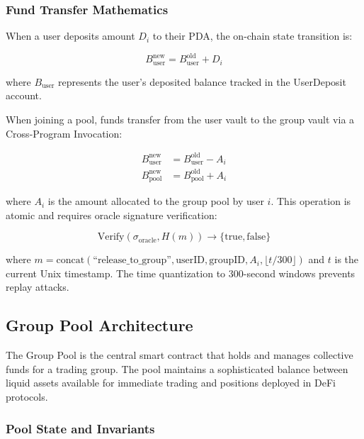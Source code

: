 \documentclass[11pt,a4paper]{article}
\begin{document}
\subsubsection{Fund Transfer Mathematics}

When a user deposits amount $D_i$ to their PDA, the on-chain state transition is:

\begin{equation}
B_{\text{user}}^{\text{new}} = B_{\text{user}}^{\text{old}} + D_i
\end{equation}

where $B_{\text{user}}$ represents the user's deposited balance tracked in the UserDeposit account.

When joining a pool, funds transfer from the user vault to the group vault via a Cross-Program Invocation:

\begin{equation}
\begin{aligned}
B_{\text{user}}^{\text{new}} &= B_{\text{user}}^{\text{old}} - A_i \\
B_{\text{pool}}^{\text{new}} &= B_{\text{pool}}^{\text{old}} + A_i
\end{aligned}
\end{equation}

where $A_i$ is the amount allocated to the group pool by user $i$. This operation is atomic and requires oracle signature verification:

\begin{equation}
\text{Verify}(\sigma_{\text{oracle}}, H(m)) \rightarrow \{\text{true}, \text{false}\}
\end{equation}

where $m = \text{concat}(\text{``release\_to\_group''}, \text{userID}, \text{groupID}, A_i, \lfloor t/300 \rfloor)$ and $t$ is the current Unix timestamp. The time quantization to 300-second windows prevents replay attacks.

\subsection{Group Pool Architecture}

The Group Pool is the central smart contract that holds and manages collective funds for a trading group. The pool maintains a sophisticated balance between liquid assets available for immediate trading and positions deployed in DeFi protocols.

\subsubsection{Pool State and Invariants}
\end{document}
